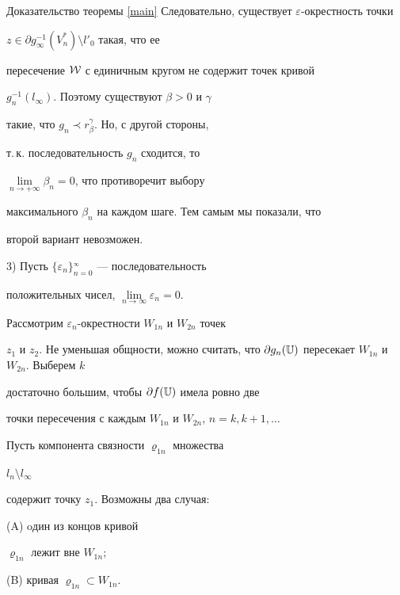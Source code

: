 \begin{pf*}{Доказательство теоремы \ref{main}}
Следовательно, существует $\varepsilon$-окрестность точки


$z\in\partial g_\infty^{-1}(V^*_n)\setminus l'_0$ такая, что ее


пересечение $\cal W$ с единичным кругом не содержит точек кривой


$g_n^{-1}(l_\infty)$. Поэтому существуют $\beta>0$ и $\gamma$


такие, что $g_{n}\prec r_\beta^\gamma$. Но, с другой стороны,


т.\,к. последовательность $g_n$ сходится, то


$\lim\limits_{n\to+\infty}\beta_n=0$, что противоречит выбору


максимального $\beta_n$ на каждом шаге. Тем самым мы показали, что


второй вариант невозможен.





3) Пусть $\{\varepsilon_n\}_{n=0}^{_\infty}$ --- последовательность


положительных чисел,  $\lim\limits_{n\to\infty}\varepsilon_n=0$.


Рассмотрим $\varepsilon_n$-окрестности $W_{1n}$ и $W_{2n}$ точек


$z_1$ и $z_2$. Не уменьшая общности, можно считать, что $\partial


g_n(\Bbb U)$ пересекает $W_{1n}$ и $W_{2n}$. Выберем $k$


достаточно большим, чтобы $\partial f (\Bbb U)$ имела ровно две


точки пересечения с каждым $W_{1n}$ и $W_{2n}$, $n=k,k+1,\dotsc$





Пусть компонента связности $\varrho_{1n}$ множества


$l_n\setminus l_\infty$


содержит точку $z_1$. Возможны два случая:


\renewcommand{\theenumi}{(\Alph{enumi})}





(A) oдин из концов кривой


$\varrho_{1n}$ лежит вне $W_{1n}$;





(B) кривая $\varrho_{1n}\subset W_{1n}$.






\end{pf*}
